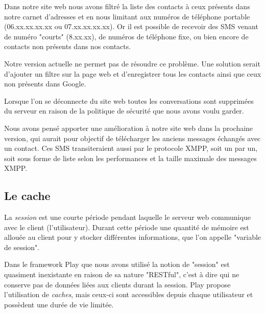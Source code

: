 Dans notre site web nous avons filtré la liste des contacts à ceux présents dans notre carnet d'adresses et en nous limitant aux numéros de téléphone portable (06.xx.xx.xx.xx ou 07.xx.xx.xx.xx).
Or il est possible de recevoir des SMS venant de numéro "courts" (8.xx.xx), de numéros de téléphone fixe, ou bien encore de contacts non présents dans nos contacts.

Notre version actuelle ne permet pas de résoudre ce problème.
Une solution serait d'ajouter un filtre sur la page web et d’enregistrer tous les contacts ainsi que ceux non présents dans Google.



Lorsque l'on se déconnecte du site web toutes les conversations sont supprimées du serveur en raison de la politique de sécurité que nous avons voulu garder.

Nous avons pensé apporter une amélioration à notre site web dans la prochaine version, qui aurait pour objectif de télécharger les anciens messages échangés avec un contact.
Ces SMS transiteraient aussi par le protocole XMPP, soit un par un, soit sous forme de liste selon les performances et la taille maximale des messages XMPP.




\subsection{Le cache}

La \textit{session} est une courte période pendant laquelle le serveur web communique avec le client (l'utilisateur).
Durant cette période une quantité de mémoire est allouée au client pour y stocker différentes informations, que l'on appelle "variable de session".

Dans le framework Play que nous avons utilisé la notion de "session" est quasiment inexistante en raison de sa nature "RESTful", c'est à dire qui ne conserve pas de données liées aux clients durant la session.
Play propose l'utilisation de \textit{caches}, mais ceux-ci sont accessibles depuis chaque utilisateur et possèdent une durée de vie limitée.
\\


